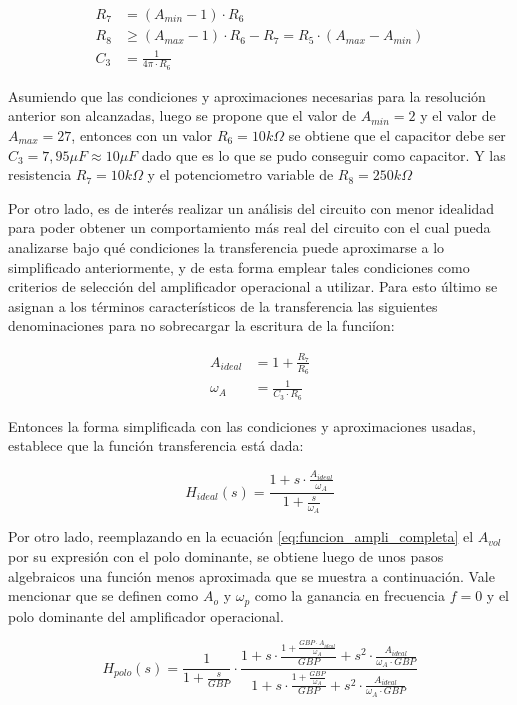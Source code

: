 \begin{align}
    R_7 &= (A_{min} - 1) \cdot R_6 \\
    R_8 &\geq (A_{max} - 1) \cdot R_6 - R_7 = R_5 \cdot (A_{max} - A_{min}) \\
    C_3 &= \frac{1}{4 \pi \cdot R_6}
\end{align}

Asumiendo que las condiciones y aproximaciones necesarias para la resoluci\'on anterior son alcanzadas, luego se propone que el valor de
$A_{min} = 2$ y el valor de $A_{max} = 27$, entonces con un valor $R_6 = 10k \Omega$ se obtiene que el capacitor debe ser $C_3 = 7,95 \mu F \approx 10 \mu F$ dado que es lo que 
se pudo conseguir como capacitor. Y las resistencia $R_7 = 10k \Omega$ y el potenciometro variable de $R_8 = 250k \Omega$

Por otro lado, es de inter\'es realizar un an\'alisis del circuito con menor idealidad para poder obtener un comportamiento m\'as real del circuito con el cual pueda analizarse bajo qu\'e condiciones la transferencia
puede aproximarse a lo simplificado anteriormente, y de esta forma emplear tales condiciones como criterios de selecci\'on del amplificador operacional a utilizar. Para esto \'ultimo se asignan a los t\'erminos caracter\'isticos
de la transferencia las siguientes denominaciones para no sobrecargar la escritura de la funci\'ion:

\begin{align*}
    A_{ideal} & = 1 + \frac{R_7}{R_6} \\
    \omega_A &= \frac{1}{C_3 \cdot R_6} 
\end{align*}

Entonces la forma simplificada con las condiciones y aproximaciones usadas, establece que la funci\'on transferencia est\'a dada:

\begin{equation}
    H_{ideal}(s) = \frac{1 + s \cdot \frac{A_{ideal}}{\omega_A}}{1 + \frac{s}{\omega_A}}
\end{equation}

Por otro lado, reemplazando en la ecuaci\'on \ref{eq:funcion_ampli_completa} el $A_{vol}$ por su expresi\'on con el polo dominante, se obtiene luego de unos pasos
algebraicos una funci\'on menos aproximada que se muestra a continuaci\'on. Vale mencionar que se definen como $A_o$ y $\omega_p$ como la ganancia en frecuencia $f = 0$ y el polo
dominante del amplificador operacional.

\begin{equation}
    H_{polo}(s) = \frac{1}{1 + \frac{s}{GBP}} \cdot \frac{1 + s \cdot \frac{1 + \frac{GBP \cdot A_{ideal}}{\omega_A}}{GBP} + s^{2} \cdot \frac{A_{ideal}}{\omega_A \cdot GBP}}{1 + s \cdot \frac{1 + \frac{GBP}{\omega_A}}{GBP} + s^{2} \cdot \frac{A_{ideal}}{\omega_A \cdot GBP}}
\end{equation}


